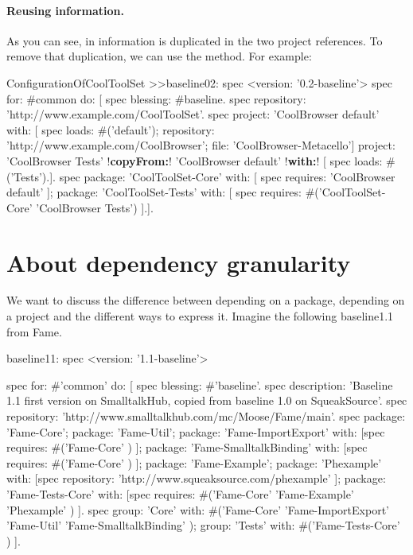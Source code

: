 \documentclass[a4paper,10pt,twoside]{book}
\begin{document}
\paragraph{Reusing information.}
As you can see, in  information is duplicated in the two project references. To remove that duplication, we can use the  method.  For example:

\begin{code}{}
ConfigurationOfCoolToolSet >>baseline02: spec 
       <version: '0.2-baseline'>
       spec for: #common do: [
              spec blessing: #baseline.
              spec repository: 'http://www.example.com/CoolToolSet'.
              spec
                    project: 'CoolBrowser default' with: [
                            spec
                                   loads: #('default');
                                   repository: 'http://www.example.com/CoolBrowser';
                                   file: 'CoolBrowser-Metacello']
                    project: 'CoolBrowser Tests' 
                            !\textbf{copyFrom:}! 'CoolBrowser default' 
                            !\textbf{with:}! [ spec loads: #('Tests').].
              spec 
                     package: 'CoolToolSet-Core' with: [ spec requires: 'CoolBrowser default' ];
                     package: 'CoolToolSet-Tests' with: [ 
                            spec requires: #('CoolToolSet-Core' 'CoolBrowser Tests') ].].                                   
\end{code}


\section{About dependency granularity}
We want to discuss the difference between depending on a package, depending on a project and the different ways to express it.
Imagine the following baseline1.1 from Fame. 

\begin{code}{}
baseline11: spec
	<version: '1.1-baseline'>

	spec for: #'common' do: [
		spec blessing: #'baseline'.
		spec description: 'Baseline 1.1 first version on SmalltalkHub, copied from baseline 1.0 on SqueakSource'.
		spec repository: 'http://www.smalltalkhub.com/mc/Moose/Fame/main'.
		spec 
			package: 'Fame-Core';
			package: 'Fame-Util';
			package: 'Fame-ImportExport' with: [spec requires: #('Fame-Core' ) ];
			package: 'Fame-SmalltalkBinding' with: [spec requires: #('Fame-Core' ) ];
			package: 'Fame-Example';
			package: 'Phexample' with: [spec repository: 'http://www.squeaksource.com/phexample' ];
			package: 'Fame-Tests-Core' with: [spec requires: #('Fame-Core' 'Fame-Example' 'Phexample' ) ].
		spec 
			group: 'Core' with: #('Fame-Core' 'Fame-ImportExport' 'Fame-Util' 'Fame-SmalltalkBinding' );
			group: 'Tests' with: #('Fame-Tests-Core' ) ].
\end{code}
\end{document}
